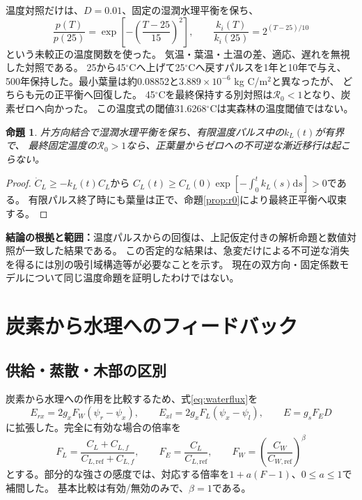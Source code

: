 \documentclass[a4paper,11pt]{ltjsarticle}
\newcommand{\dd}{\mathrm{d}}
\newcommand{\evidence}[1]{\par\smallskip\noindent\textbf{結論の根拠と範囲：}#1\par\smallskip}
\newtheorem{proposition}{命題}[section]
\begin{document}
温度対照だけは、$D=0.01$、固定の湿潤水理平衡を保ち、
\begin{equation}
 \frac{p(T)}{p(25)}=\exp\left[-\left(\frac{T-25}{15}\right)^2\right],
 \qquad
 \frac{k_i(T)}{k_i(25)}=2^{(T-25)/10}
\end{equation}
という未較正の温度関数を使った。
気温・葉温・土温の差、適応、遅れを無視した対照である。
25から45$^\circ$Cへ上げて25$^\circ$Cへ戻すパルスを1年と10年で与え、
500年保持した。最小葉量は約0.08852と$3.889\times10^{-6}$ kg C/m$^2$と異なったが、
どちらも元の正平衡へ回復した。
45$^\circ$Cを最終保持する別対照は$\mathcal R_0<1$となり、炭素ゼロへ向かった。
この温度式の閾値31.6268$^\circ$Cは実森林の温度閾値ではない。

\begin{proposition}
片方向結合で湿潤水理平衡を保ち、有限温度パルス中の$k_L(t)$が有界で、
最終固定温度の$\mathcal R_0>1$なら、正葉量からゼロへの不可逆な漸近移行は起こらない。
\end{proposition}
\begin{proof}
$\dot C_L\ge-k_L(t)C_L$から
$C_L(t)\ge C_L(0)\exp[-\int_0^t k_L(s)\dd s]>0$である。
有限パルス終了時にも葉量は正で、命題\ref{prop:r0}により最終正平衡へ収束する。
\end{proof}
\evidence{温度パルスからの回復は、上記仮定付きの解析命題と数値対照が一致した結果である。
この否定的な結果は、急変だけによる不可逆な消失を得るには別の吸引域構造等が必要なことを示す。
現在の双方向・固定係数モデルについて同じ温度命題を証明したわけではない。}

\section{炭素から水理へのフィードバック}\label{sec:feedback}
\subsection{供給・蒸散・木部の区別}
炭素から水理への作用を比較するため、式\eqref{eq:waterflux}を
\begin{equation}\label{eq:structural}
 E_{rx}=2g_xF_W(\psi_r-\psi_x),\qquad
 E_{xl}=2g_xF_L(\psi_x-\psi_l),\qquad E=g_sF_ED
\end{equation}
に拡張した。完全に有効な場合の倍率を
\begin{equation}\label{eq:factors}
 F_L=\frac{C_L+C_{L,f}}{C_{L,\mathrm{ref}}+C_{L,f}},\qquad
 F_E=\frac{C_L}{C_{L,\mathrm{ref}}},\qquad
 F_W=\left(\frac{C_W}{C_{W,\mathrm{ref}}}\right)^\beta
\end{equation}
とする。部分的な強さの感度では、対応する倍率を$1+a(F-1)$、$0\le a\le1$で補間した。
基本比較は有効/無効のみで、$\beta=1$である。
\end{document}

